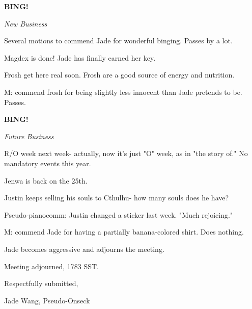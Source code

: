 \documentclass[12pt]{article}
\newcommand{\bing}{{\bf BING!} }
\newcommand{\goto}[1]{\bing \vskip 12pt \centerline{{\em{#1}}}}
\begin{document}
\goto{New Business}

Several motions to commend Jade for wonderful binging. Passes by a lot.

Magdex is done! Jade has finally earned her key.

Frosh get here real soon. Frosh are a good source of energy and nutrition.

M: commend frosh for being slightly less innocent than Jade pretends to be. Passes.

\goto{Future Business}

R/O week next week- actually, now it's just "O" week, as in "the story of." No mandatory events this year.

Jenwa is back on the 25th.

Justin keeps selling his souls to Cthulhu- how many souls does he have?

Pseudo-pianocomm: Justin changed a sticker last week. "Much rejoicing."

M: commend Jade for having a partially banana-colored shirt. Does nothing.

Jade becomes aggressive and adjourns the meeting.

\vspace{12pt}

\noindent
Meeting adjourned, 1783 SST.

\vspace{18pt}

\centerline{Respectfully submitted,}
\centerline{Jade Wang, Pseudo-Onseck}
\end{document}

